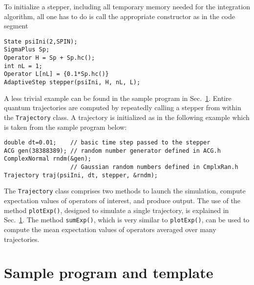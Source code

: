 To initialize a stepper, including all temporary memory needed for the
integration algorithm, all one has to do is call the appropriate
constructor as in the code segment
\begin{verbatim}
State psiIni(2,SPIN);
SigmaPlus Sp;
Operator H = Sp + Sp.hc();
int nL = 1;
Operator L[nL] = {0.1*Sp.hc()}
AdaptiveStep stepper(psiIni, H, nL, L);
\end{verbatim}
A less trivial example can be found in the sample program in
Sec.~\ref{secsample}.  Entire quantum trajectories are computed by repeatedly
calling a stepper from within the {\tt Trajectory} class. A trajectory is
initialized as in the following example which is taken from the sample program
below:
\begin{verbatim}
double dt=0.01;    // basic time step passed to the stepper
ACG gen(38388389); // random number generator defined in ACG.h
ComplexNormal rndm(&gen); 
                   // Gaussian random numbers defined in CmplxRan.h
Trajectory traj(psiIni, dt, stepper, &rndm);
\end{verbatim}

The {\tt Trajectory} class comprises two methods to launch the
simulation, compute expectation values of operators of interest, and produce
output. The use of the method {\tt plotExp()}, designed to simulate a single
trajectory, is explained in Sec.~\ref{secsample}. The method {\tt sumExp()},
which is very similar to {\tt plotExp()}, can be used to compute the mean
expectation values of operators averaged over many trajectories.

\section{Sample program and template}   \label{secsample}


